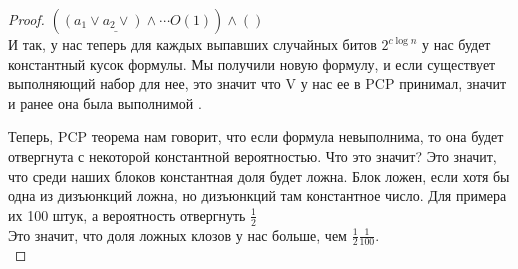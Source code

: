 \begin{proof}
	$(\underline{(a_1 \vee a_2 \vee )\wedge \cdots}{O(1)})\wedge()$\\

	И так, у нас теперь для каждых выпавших случайных битов $2^{c\log n}$ у нас будет константный кусок формулы.
	Мы получили новую формулу, и если существует выполняющий набор для нее, это значит что V у нас ее в PCP принимал,
	значит и ранее она была выполнимой .

        Теперь, PCP теорема нам говорит, что если формула невыполнима, то она будет отвергнута с некоторой константной
        вероятностью. Что это значит? Это значит, что среди наших блоков константная доля будет ложна. Блок ложен, 
        если хотя бы одна из дизъюнкций ложна, но дизъюнкций там константное число. Для примера их 100 штук, а вероятность отвергнуть 
        $\frac{1}{2}$\\
        Это значит, что доля ложных клозов у нас больше, чем $\frac{1}{2}\frac{1}{100}$.\\
\end{proof}                                                                     

